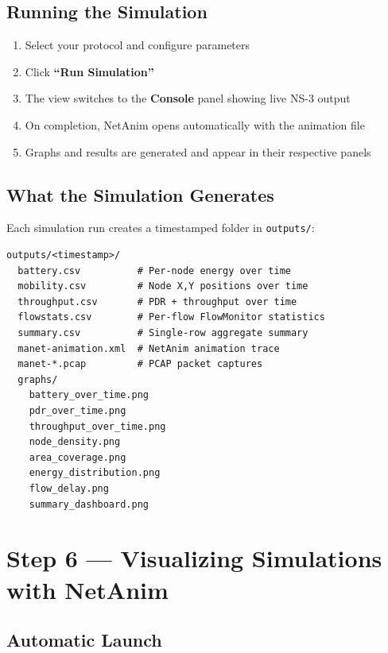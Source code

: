 \documentclass[12pt,a4paper]{article}
\newcommand{\file}[1]{\texttt{\color{codered}#1}}
\begin{document}
\subsection{Running the Simulation}

\begin{enumerate}[leftmargin=1.5em]
  \item Select your protocol and configure parameters
  \item Click \textbf{``Run Simulation''}
  \item The view switches to the \textbf{Console} panel showing live NS-3 output
  \item On completion, NetAnim opens automatically with the animation file
  \item Graphs and results are generated and appear in their respective panels
\end{enumerate}

\subsection{What the Simulation Generates}

Each simulation run creates a timestamped folder in \file{outputs/}:

\begin{lstlisting}[style=bash, caption={Generated output structure}]
outputs/<timestamp>/
  battery.csv          # Per-node energy over time
  mobility.csv         # Node X,Y positions over time
  throughput.csv       # PDR + throughput over time
  flowstats.csv        # Per-flow FlowMonitor statistics
  summary.csv          # Single-row aggregate summary
  manet-animation.xml  # NetAnim animation trace
  manet-*.pcap         # PCAP packet captures
  graphs/
    battery_over_time.png
    pdr_over_time.png
    throughput_over_time.png
    node_density.png
    area_coverage.png
    energy_distribution.png
    flow_delay.png
    summary_dashboard.png
\end{lstlisting}


\section{Step 6 — Visualizing Simulations with NetAnim}

\subsection{Automatic Launch}
\end{document}
